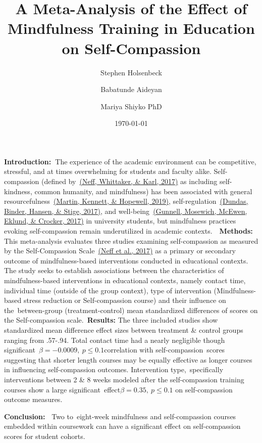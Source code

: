 \documentclass[10pt]{article}
\renewenvironment{abstract}
  {{\bfseries\noindent{\abstractname}\par\nobreak}\footnotesize}
  {\bigskip}
\begin{document}
\title{
\centering
A Meta-Analysis of the Effect of Mindfulness Training in Education on Self-Compassion}


\author[1]{Stephen Holsenbeck}%
%
\author[1]{Babatunde Aideyan}%
\author[1]{Mariya Shiyko PhD}%


\vspace{-1em}



  \date{\today}


\begingroup
\let\center\flushleft
\let\endcenter\endflushleft
\maketitle
\endgroup




\colorbox{teal!10}{%
\begin{minipage}{1\linewidth}%
\begin{abstract}
\textbf{Introduction:~}The experience of the academic environment can be
competitive, stressful, and at times overwhelming for students and
faculty alike. Self-compassion (defined by~\hyperref[csl:1]{(Neff, Whittaker, \& Karl, 2017)} as
including self-kindness, common humanity, and mindfulness) has been
associated with general resourcefulness~\hyperref[csl:2]{(Martin, Kennett, \& Hopewell, 2019)},
self-regulation~\hyperref[csl:3]{(Dundas, Binder, Hansen, \& Stige, 2017)}, and well-being~\hyperref[csl:4]{(Gunnell, Mosewich, McEwen, Eklund, \& Crocker, 2017)} in
university students, but mindfulness practices evoking self-compassion
remain underutilized in academic contexts.~~\textbf{Methods:} This
meta-analysis evaluates three studies examining self-compassion as
measured by the Self-Compassion Scale~\hyperref[csl:1]{(Neff et al., 2017)} as a primary or
secondary outcome of mindfulness-based interventions conducted in
educational contexts. The study seeks to establish associations between
the characteristics of mindfulness-based interventions in educational
contexts, namely contact time, individual time (outside of the group
context), type of intervention (Mindfulness-based stress reduction or
Self-compassion course) and their influence on the~between-group
(treatment-control) mean standardized differences of scores on the
Self-compassion scale.~\textbf{Results:} The three included studies show
standardized mean difference effect sizes between treatment \& control
groups ranging from .57-.94. Total contact time had a nearly negligible
though significant~$\beta=-0.0009,\ p\le0.1$correlation with
self-compassion~scores suggesting that shorter length courses may be
equally effective as longer courses in influencing self-compassion
outcomes. Intervention type,~specifically interventions between 2 \& 8
weeks modeled after the self-compassion training courses show a large
significant~effect$\beta = 0.35,\ p\leq0.1$ on self-compassion outcome
measures.

\textbf{Conclusion:~} Two to~eight-week mindfulness and self-compassion courses embedded
within coursework can have a significant effect on self-compassion
scores for student cohorts.%
\end{abstract}%
\end{minipage}%
}
\end{document}
